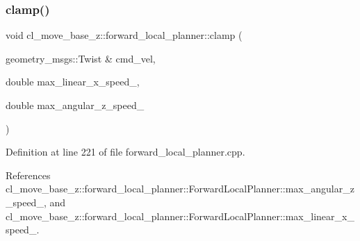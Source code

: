 \subsubsection{\texorpdfstring{clamp()}{clamp()}}
{\footnotesize\ttfamily void cl\+\_\+move\+\_\+base\+\_\+z\+::forward\+\_\+local\+\_\+planner\+::clamp (\begin{DoxyParamCaption}\item[{geometry\+\_\+msgs\+::\+Twist \&}]{cmd\+\_\+vel,  }\item[{double}]{max\+\_\+linear\+\_\+x\+\_\+speed\+\_\+,  }\item[{double}]{max\+\_\+angular\+\_\+z\+\_\+speed\+\_\+ }\end{DoxyParamCaption})}



Definition at line 221 of file forward\+\_\+local\+\_\+planner.\+cpp.



References cl\+\_\+move\+\_\+base\+\_\+z\+::forward\+\_\+local\+\_\+planner\+::\+Forward\+Local\+Planner\+::max\+\_\+angular\+\_\+z\+\_\+speed\+\_\+, and cl\+\_\+move\+\_\+base\+\_\+z\+::forward\+\_\+local\+\_\+planner\+::\+Forward\+Local\+Planner\+::max\+\_\+linear\+\_\+x\+\_\+speed\+\_\+.



